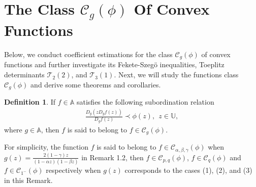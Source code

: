 \documentclass[11pt,twoside, reqno]{article}
\theoremstyle{definition}
\newtheorem{definition}[theorem]{Definition}
\begin{document}
\section{The Class $\mathcal{C}_{g}(\phi)$ Of Convex Functions }
\setcounter{equation}{0} \setcounter{theorem}{0}

Below, we conduct coefficient estimations for the class $\mathcal{C}_{g}(\phi)$ of convex functions and further investigate its Fekete-Szeg\"{o} inequalities, Toeplitz determinants $\mathcal{T}_2(2)$, and $\mathcal{T}_3(1)$. Next, we will study the functions class $\mathcal{C}_{g}(\phi)$ and derive some theorems and corollaries.
\begin{definition}
If $f\in \mathbb{A} $ satisfies the following subordination relation
\begin{align}
\frac{D_{g}(zD_{g}f(z))}{D_{g}f(z)}\prec \phi(z),\ \ z\in\mathbb{U}\nonumber,
\end{align}
where $g\in \mathbb{A}$, then $f$ is said to belong to $f\in\mathcal{C}_{g}(\phi)$.

For simplicity, the function $f$ is said to belong to $f\in\mathcal{C}_{\alpha, \beta, \gamma}(\phi)$ when $g(z)=\frac{2(1-\gamma)z}{(1-\alpha z)(1-\beta z)}$ in Remark 1.2, then $f\in\mathcal{C}_{p,q}(\phi)$, $f\in\mathcal{C}_{q}(\phi)$ and $f\in\mathcal{C}_{1^{-}}(\phi)$ respectively when $g(z)$ corresponds to the cases (1), (2), and (3) in this Remark.

\end{definition}
\end{document}
